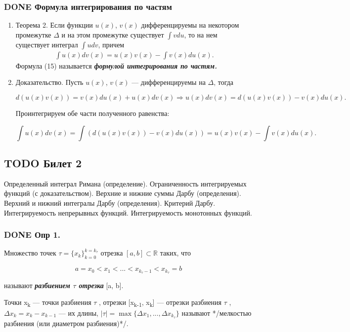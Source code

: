 \documentclass[11pt]{article}
\begin{document}
\subsubsection{{\bfseries\sffamily DONE} Формула интегрирования по частям}
\label{sec:org1d1fec0}
\begin{enumerate}
\item Теорема 2.
\label{sec:org7d45aa8}
Если функции \(u(x)\), \(v(x)\) дифференцируемы на некотором промежутке
\(\Delta\) и на этом промежутке существует \(\int vdu\), то на нем существует интеграл 
\(\int udv\), причем
\begin{eqnarray}
\int u(x)dv(x)=u(x)v(x)-\int v(x)du(x).
\end{eqnarray}
Формула (15) называется \textbf{\emph{формулой интегрирования по частям.}}
\item Доказательство.
\label{sec:orga385292}
Пусть \(u(x)\), \(v(x)\) — дифференцируемы на \(\Delta\), тогда

$$
d(u(x)v(x))=v(x)du(x)+u(x)dv(x)\Rightarrow u(x)dv(x)=d(u(x)v(x))-v(x)du(x).
$$

Проинтегрируем обе части полученного равенства:

$$
\int u(x)dv(x)=\int(d(u(x)v(x))-v(x)du(x))=u(x)v(x)-\int v(x)du(x).
$$
\end{enumerate}

\subsection{{\bfseries\sffamily TODO} Билет 2}
\label{sec:orgb875bd0}
Определенный интеграл Римана (определение). Ограниченность интегрируемых функций (с доказательством). Верхние и нижние суммы Дарбу (определения). Верхний и нижний интегралы Дарбу (определения). Критерий Дарбу. Интегрируемость непрерывных функций. Интегрируемость монотонных функций.

\subsubsection{{\bfseries\sffamily DONE} Опр 1.}
\label{sec:orgc5024b8}
Множество точек \(\tau=\{x_k\}_{k=0}^{k=k_\tau}\) отрезка \([a,b]\subset \mathbb{R}\) таких, что

$$
a=x_0 < x_1 < ... < x_{k_\tau−1} < x_{k_\tau} = b
$$

называют \textbf{\emph{разбиением \(\tau\) отрезка}} [a, b]. 

Точки x\textsubscript{k} — точки разбиения \(\tau\) , отрезки [x\textsubscript{k-1}, x\textsubscript{k}]
 — отрезки разбиения \(\tau\) , \(\Delta x_k = x_k − x_{k−1}\) — их длины, \(|\tau | = \max \{\Delta x_1 ,... , \Delta x_{k_\tau}\}\) называют */мелкостью разбиения (или диаметром разбиения)*/.
\end{document}
